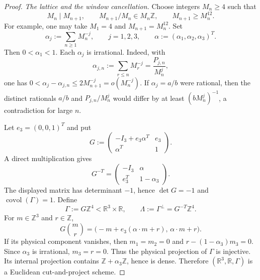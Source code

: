 \documentclass[10pt,a4paper]{amsart}
\begin{document}
\begin{proof}
\smallskip\noindent\emph{The lattice and the window cancellation.}
Choose integers $M_n\geq4$ such that
\begin{equation}\label{eq:cap-codim-one-growth}
  M_n\mid M_{n+1},
  \qquad
  M_{n+1}/M_n\in M_n\mathbb Z,
  \qquad
  M_{n+1}\geq M_n^{12}.
\end{equation}
For example, one may take $M_1=4$ and $M_{n+1}=M_n^{12}$.  Set
\begin{equation}\label{eq:cap-codim-one-alpha}
  \alpha_j:=\sum_{n\geq1}M_n^{-j},
  \qquad j=1,2,3,
  \qquad
  \alpha:=(\alpha_1,\alpha_2,\alpha_3)^T.
\end{equation}
Then $0<\alpha_1<1$.  Each $\alpha_j$ is irrational.  Indeed, with
\begin{equation}\label{eq:cap-codim-one-prefixes-intro}
  \alpha_{j,n}:=\sum_{r\leq n}M_r^{-j}
  =\frac{P_{j,n}}{M_n^j},
\end{equation}
one has
\(
  0<\alpha_j-\alpha_{j,n}\leq2M_{n+1}^{-j}=o(M_n^{-j}).
\)
If $\alpha_j=a/b$ were rational, then the distinct rationals $a/b$ and
$P_{j,n}/M_n^j$ would differ by at least $(bM_n^j)^{-1}$, a contradiction for
large $n$.

Let $e_3=(0,0,1)^T$ and put
\begin{equation}\label{eq:cap-codim-one-G}
  G:=
  \begin{pmatrix}
    -I_3+e_3\alpha^T & e_3\\
    \alpha^T & 1
  \end{pmatrix}.
\end{equation}
A direct multiplication gives
\begin{equation}\label{eq:cap-codim-one-Gdual}
  G^{-T}
  =
  \begin{pmatrix}
    -I_3 & \alpha\\
    e_3^T & 1-\alpha_3
  \end{pmatrix}.
\end{equation}
The displayed matrix has determinant $-1$, hence $\det G=-1$ and
$\operatorname{covol}(\Gamma)=1$.  Define
\[
  \Gamma:=G\mathbb Z^4<\mathbb R^3\times\mathbb R,
  \qquad
  \Lambda:=\Gamma^\perp=G^{-T}\mathbb Z^4.
\]
For $m\in\mathbb Z^3$ and $r\in\mathbb Z$,
\[
  G\binom mr
  =\bigl(-m+e_3(\alpha\cdot m+r),\,\alpha\cdot m+r\bigr).
\]
If its physical component vanishes, then $m_1=m_2=0$ and
$r-(1-\alpha_3)m_3=0$.  Since $\alpha_3$ is irrational, $m_3=r=0$.
Thus the physical projection of $\Gamma$ is injective.  Its internal
projection contains $\mathbb Z+\alpha_3\mathbb Z$, hence is dense.  Therefore
$(\mathbb R^3,\mathbb R,\Gamma)$ is a Euclidean cut-and-project scheme.


\end{proof}
\end{document}
